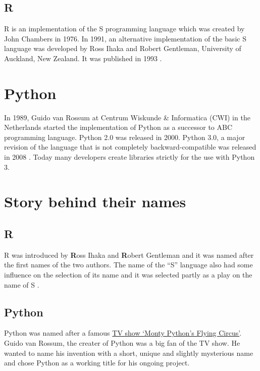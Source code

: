 \documentclass[]{book}
\begin{document}
\hypertarget{r-1}{%
\subsection{R}\label{r-1}}

R is an implementation of the S programming language which was created by John Chambers in 1976. In 1991, an alternative implementation of the basic S language was developed by Ross Ihaka and Robert Gentleman, University of Auckland, New Zealand. It was published in 1993 \citep{wikiR}.

\hypertarget{python-1}{%
\section{Python}\label{python-1}}

In 1989, Guido van Rossum at Centrum Wiskunde \& Informatica (CWI) in the Netherlands started the implementation of Python as a successor to ABC programming language. Python 2.0 was released in 2000. Python 3.0, a major revision of the language that is not completely backward-compatible was released in 2008 \citep{wikipython} . Today many developers create libraries strictly for the use with Python 3.

\hypertarget{story-behind-their-names}{%
\section{Story behind their names}\label{story-behind-their-names}}

\hypertarget{r-2}{%
\subsection{R}\label{r-2}}

R was introduced by \textbf{R}oss Ihaka and \textbf{R}obert Gentleman and it was named after the first names of the two authors. The name of the ``S'' language also had some influence on the selection of its name and it was selected partly as a play on the name of S \citep{wikiR}.

\hypertarget{python-2}{%
\subsection{Python}\label{python-2}}

Python was named after a famous \href{https://en.wikipedia.org/wiki/Monty_Python\%27s_Flying_Circus}{TV show `Monty Python's Flying Circus'}. Guido van Rossum, the creater of Python was a big fan of the TV show. He wanted to name his invention with a short, unique and slightly mysterious name and chose Python as a working title for his ongoing project.
\end{document}
